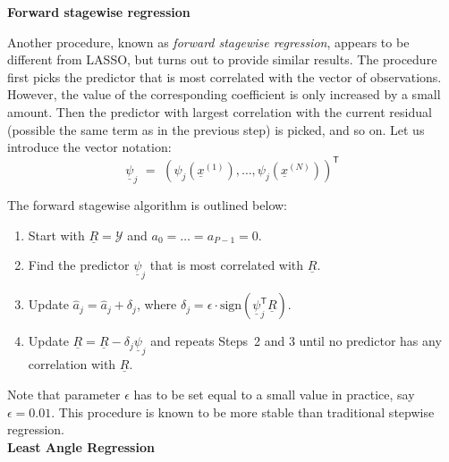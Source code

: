 {\textbf{Forward stagewise regression} \vspace{2mm}

Another procedure, known as \emph{forward stagewise regression}, appears to be different from LASSO, but turns out to provide similar results. The procedure first picks the predictor that is most correlated with the vector of observations. However, the value of the corresponding coefficient is only increased by a small amount. Then the predictor with largest correlation with the current residual (possible the same term as in the previous step) is picked, and so on. Let us introduce the vector notation:
\begin{equation} 
	\underline{\psi}_{j} \, \, = \, \, (\psi_{j}(\underline{x}^{(1)}) , \dots, \psi_{j}(\underline{x}^{(N)}) )^{\textsf{T}}
\end{equation} 

The forward stagewise algorithm is outlined below:
\begin{enumerate}
	\item Start with $\underline{R} = \mathcal{Y}$ and $a_{0} = \dots = a_{P-1} = 0$.
	\item Find the predictor $\underline{\psi}_{j}$ that is most correlated with $\underline{R}$.
	\item Update $\hat{a}_{j} = \hat{a}_{j} + \delta_{j}$, where $\delta_{j} = \epsilon \cdot \mbox{sign}(\underline{\psi}_{j}^{\textsf{T}} \underline{R} )$.
	\item Update $\underline{R} =  \underline{R} - \delta_{j} \underline{\psi}_{j}$ and repeats Steps~2 and 3 until no predictor has any correlation with $\underline{R}$.
\end{enumerate}  
Note that parameter $\epsilon$ has to be set equal to a small value in practice, say $\epsilon=0.01$. This procedure is known to be more stable than traditional stepwise regression. \\

\textbf{Least Angle Regression} \vspace{2mm}

}
